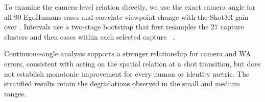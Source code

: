 \begin{table}[t]
  \centering
  \caption{Additional gain at large viewpoints relative to the remaining
  views, with 95\% recording/capture-cluster bootstrap intervals.}
  \label{tab:supp-viewpoint-interaction}
  \small
  \resizebox{0.88\textwidth}{!}{}
\end{table}

To examine the camera-level relation directly, we use the exact camera angle
for all 90 EgoHumans cases and correlate viewpoint change with the Shot3R gain
over \humanthree{}. Intervals use a two-stage bootstrap that first resamples
the 27 capture clusters and then cases within each selected capture
~\citep{davison1997bootstrap}.

\begin{table}[t]
  \centering
  \caption{Relation between viewpoint change and reconstruction gain on
  EgoHumans. Left: case-level Spearman correlation with two-stage
  capture-cluster bootstrap intervals. Right: mean gains in the predefined
  angle strata. W/WA are in mm, camera rotation in degrees, and camera
  translation in m; positive values favour \method{}.}
  \label{tab:supp-egohumans-viewpoint-camera}
  \scriptsize
  \resizebox{\textwidth}{!}{}
\end{table}

Continuous-angle analysis supports a stronger relationship for camera and WA
errors, consistent with \method{} acting on the spatial relation at a shot
transition, but does not establish monotonic improvement for every human or
identity metric. The stratified results retain the degradations observed in
the small and medium ranges.

